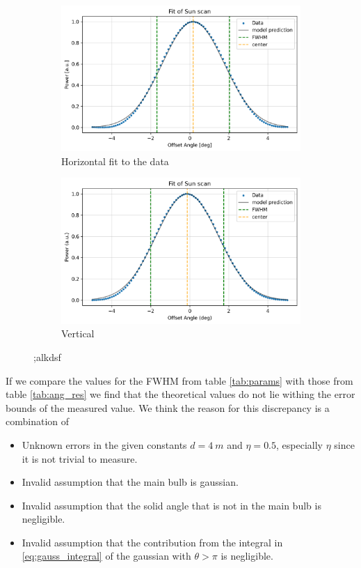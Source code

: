 \begin{figure}[ht]
    \centering
    \begin{subfigure}[b]{0.45\textwidth}
        \centering
        \includegraphics[width=\textwidth]{assets/sun_scan_fit_h.png}
        \caption{Horizontal fit to the data}
        \label{fig:sun_fit_h}
    \end{subfigure}
    \hfill
    \begin{subfigure}[b]{0.45\textwidth}
        \centering
        \includegraphics[width=\textwidth]{assets/sun_scan_fit_v.png}
        \caption{Vertical}
        \label{fig:sun_fit_v}
    \end{subfigure}
    \caption{;alkdsf}
    \label{fig:sun_scan_fit}
\end{figure}
If we compare the values for the FWHM from table \ref{tab:params} with those from table \ref{tab:ang_res}
we find that the theoretical values do not lie withing the error bounds of the measured value.
We think the reason for this discrepancy is a combination of
\begin{itemize}
    \item Unknown errors in the given constants $d = \SI{4}{m}$ and $\eta = 0.5$, especially $\eta$ since it is not trivial to measure.
    \item Invalid assumption that the main bulb is gaussian.
    \item Invalid assumption that the solid angle that is not in the main bulb is negligible.
    \item Invalid assumption that the contribution from the integral in \eqref{eq:gauss_integral} of the gaussian with $\theta > \pi$ is negligible.
\end{itemize}